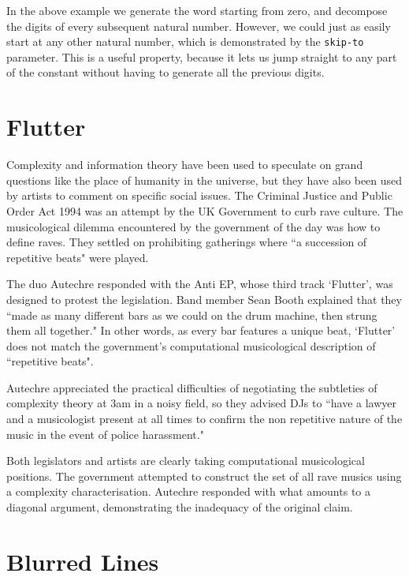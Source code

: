 \documentclass[numbers]{sigplanconf}
\begin{document}
In the above example we generate the word starting from zero, and decompose the digits of
every subsequent natural number. However, we could just as easily start at any other natural number, which is demonstrated
by the \verb|skip-to| parameter. This is a useful property, because it lets us jump straight to any part of the constant
without having to generate all the previous digits.

\section{Flutter}

Complexity and information theory have been used to speculate on grand questions like the place of humanity in the universe,
but they have also been used by artists to comment on specific social issues. The Criminal Justice and Public Order Act 1994
was an attempt by the UK Government to curb rave culture. The musicological dilemma encountered by the government of the day
was how to define raves. They settled on prohibiting gatherings where ``a succession of repetitive beats" were
played\cite{Joseph Gallivan on pop}.

The duo Autechre responded with the Anti EP\cite{Anti EP}, whose third track `Flutter', was designed to protest the legislation.
Band member
Sean Booth explained that they ``made as many different bars as we could on the drum machine, then strung them all together."
\cite{Joseph Gallivan on pop}
In other words, as every bar features a unique beat, `Flutter' does not match the government's computational musicological description
of ``repetitive beats".

Autechre appreciated the practical difficulties of negotiating the subtleties of complexity theory at 3am in a noisy field,
so they advised DJs to ``have a lawyer and a musicologist present at all times to confirm the non repetitive nature of the
music in the event of police harassment."\cite{Joseph Gallivan on pop}

Both legislators and artists are clearly taking computational musicological positions. The government attempted to construct the set
of all rave musics using a complexity characterisation. Autechre responded with what amounts to a diagonal argument, demonstrating
the inadequacy of the original claim.

\section{Blurred Lines}
\end{document}
